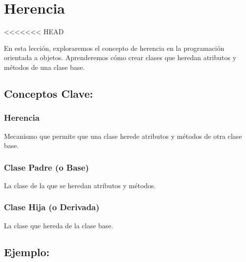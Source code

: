 \documentclass[
  a4paper,
  onepage,
  openany]{scrreprt}
\begin{document}
\hypertarget{herencia}{%
\chapter{Herencia}\label{herencia}}

\textless\textless\textless\textless\textless\textless\textless{} HEAD

En esta lección, exploraremos el concepto de herencia en la programación
orientada a objetos. Aprenderemos cómo crear clases que heredan
atributos y métodos de una clase base.

\hypertarget{conceptos-clave-56}{%
\section{Conceptos Clave:}\label{conceptos-clave-56}}

\hypertarget{herencia-1}{%
\subsection{Herencia}\label{herencia-1}}

Mecanismo que permite que una clase herede atributos y métodos de otra
clase base.

\hypertarget{clase-padre-o-base}{%
\subsection{Clase Padre (o Base)}\label{clase-padre-o-base}}

La clase de la que se heredan atributos y métodos.

\hypertarget{clase-hija-o-derivada}{%
\subsection{Clase Hija (o Derivada)}\label{clase-hija-o-derivada}}

La clase que hereda de la clase base.

\hypertarget{ejemplo-56}{%
\section{Ejemplo:}\label{ejemplo-56}}
\end{document}
